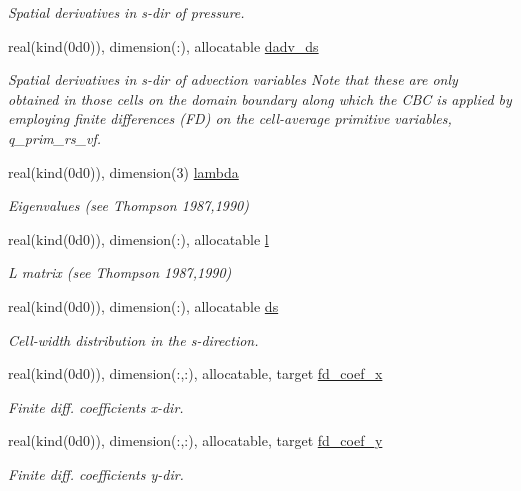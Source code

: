 \begin{DoxyCompactItemize}
\begin{DoxyCompactList}\small\item\em Spatial derivatives in s-\/dir of pressure. \end{DoxyCompactList}\item 
real(kind(0d0)), dimension(\+:), allocatable \hyperlink{namespacem__cbc_ad0e1fd6e716ca51ccf5d6954e15fb02e}{dadv\+\_\+ds}
\begin{DoxyCompactList}\small\item\em Spatial derivatives in s-\/dir of advection variables Note that these are only obtained in those cells on the domain boundary along which the C\+BC is applied by employing finite differences (FD) on the cell-\/average primitive variables, q\+\_\+prim\+\_\+rs\+\_\+vf. \end{DoxyCompactList}\item 
real(kind(0d0)), dimension(3) \hyperlink{namespacem__cbc_a7ff1c86cd167654a9c0765dea4a93ba5}{lambda}
\begin{DoxyCompactList}\small\item\em Eigenvalues (see Thompson 1987,1990) \end{DoxyCompactList}\item 
real(kind(0d0)), dimension(\+:), allocatable \hyperlink{namespacem__cbc_a44a30ad8ee6642f20f106e99fe3608f9}{l}
\begin{DoxyCompactList}\small\item\em L matrix (see Thompson 1987,1990) \end{DoxyCompactList}\item 
real(kind(0d0)), dimension(\+:), allocatable \hyperlink{namespacem__cbc_ae49e36ba93b9f5cb3adf9551c1cfb276}{ds}
\begin{DoxyCompactList}\small\item\em Cell-\/width distribution in the s-\/direction. \end{DoxyCompactList}\item 
real(kind(0d0)), dimension(\+:,\+:), allocatable, target \hyperlink{namespacem__cbc_a6f324c692d5e60e85314b1e21c81736b}{fd\+\_\+coef\+\_\+x}
\begin{DoxyCompactList}\small\item\em Finite diff. coefficients x-\/dir. \end{DoxyCompactList}\item 
real(kind(0d0)), dimension(\+:,\+:), allocatable, target \hyperlink{namespacem__cbc_ae86e3f027b189005a2b00f8f2bb9ae32}{fd\+\_\+coef\+\_\+y}
\begin{DoxyCompactList}\small\item\em Finite diff. coefficients y-\/dir. \end{DoxyCompactList}\item 

\end{DoxyCompactItemize}

